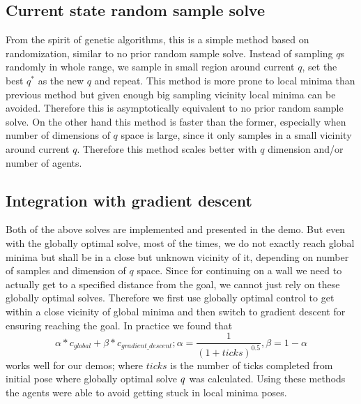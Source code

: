 \documentclass[12pt]{article}
\begin{document}
\subsection{Current state random sample solve}
From the spirit of genetic algorithms, this is a simple method based on randomization, similar to no prior random sample solve.
Instead of sampling $q$s randomly in whole range, we sample in small region around current $q$, set the best $q^*$ as the new $q$ and repeat.
This method is more prone to local minima than previous method but given enough big sampling vicinity local minima can be avoided.
Therefore this is asymptotically equivalent to no prior random sample solve.
On the other hand this method is faster than the former, especially when number of dimensions of $q$ space is large, since it only samples in a small vicinity around current $q$. Therefore this method scales better with $q$ dimension and/or number of agents.

\subsection{Integration with gradient descent}
Both of the above solves are implemented and presented in the demo.
But even with the globally optimal solve, most of the times, we do not exactly reach global minima but shall be in a close but unknown vicinity of it, depending on number of samples and dimension of $q$ space.
Since for continuing on a wall we need to actually get to a specified distance from the goal, we cannot just rely on these globally optimal solves.
Therefore we first use globally optimal control to get within a close vicinity of global minima and then switch to gradient descent for ensuring reaching the goal.
In practice we found that
\[
    \alpha * c_{global} + \beta * c_{gradient\_descent}; \alpha = \frac{1}{(1 + ticks)^{0.5}}, \beta = 1 - \alpha
\]
works well for our demos; where $ticks$ is the number of ticks completed from initial pose where globally optimal solve $q\*$ was calculated.
Using these methods the agents were able to avoid getting stuck in local minima poses.
\end{document}
